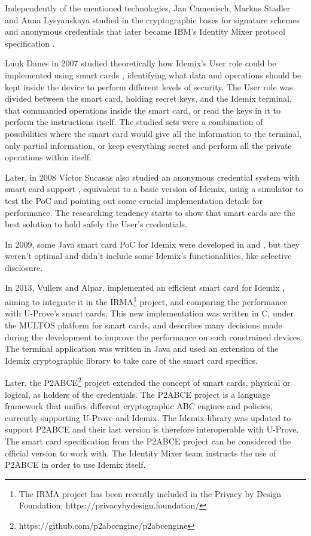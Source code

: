 \hfil

Independently of the mentioned technologies, Jan Camenisch, Markus Stadler and Anna Lysyanskaya studied in \cite{Camenisch:GroupSig,Camenisch:AnonCred,camenisch2002signature} 
the cryptographic bases for signature schemes and anonymous credentials that later became IBM's Identity Mixer protocol specification \cite{idemixSpec}.


Luuk Danes in 2007 studied theoretically how Idemix's User role could be implemented using  
smart cards \cite{luuk}, identifying what data and operations should be kept inside the device to perform different levels of security. The User role was divided between the smart card, holding secret keys, and the Idemix terminal, that commanded operations inside the smart card, or read the keys in it to perform the instructions itself. The studied sets were a combination of possibilities where the smart card would give all the information to the terminal, only partial information, or keep everything secret and perform all the private operations within itself.

Later, in 2008 V\'ictor Sucasas also studied an anonymous credential system with smart card support \cite{sucasas}, equivalent to a basic version of Idemix, using a simulator to test the PoC and pointing out some crucial implementation details for performance. The researching tendency starts to show that smart cards are the best solution to hold safely the User's credentials.

In 2009, some Java smart card PoC for Idemix were developed in \cite{javaIdemix1} and \cite{javaIdemix2}, but they weren't optimal and didn't include some Idemix's functionalities, like selective disclosure.

In 2013, Vullers and Alpar, implemented an efficient smart card for Idemix \cite{vullers2013efficient}, aiming to integrate it in the IRMA\footnote{The IRMA project has been recently included in the Privacy by Design Foundation: {https://privacybydesign.foundation/}} project, and comparing the performance with U-Prove's smart cards. This new implementation was written in C, under the MULTOS platform for smart cards, and describes many decisions made during the development to improve the performance on such constrained devices. The terminal application was written in Java and used an extension of the Idemix cryptographic library to take care of the smart card specifics.


Later, the P2ABCE\footnote{{https://github.com/p2abcengine/p2abcengine}} project extended the concept of smart cards, physical or logical, as holders of the credentials.  The P2ABCE project is a language framework that unifies different cryptographic ABC engines and policies, currently supporting U-Prove and Idemix. The Idemix library was updated to support P2ABCE and their last version is therefore interoperable with U-Prove. The smart card specification from the P2ABCE project can be considered the official version to work with. The Identity Mixer team instructs the use of P2ABCE in order to use Idemix itself.


